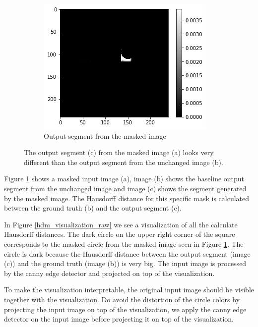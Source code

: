 \begin{figure}[H]
    \begin{subfigure}[t]{.32\textwidth}
        \centering
        \includegraphics[width=\linewidth]{chapters/06_hdm/visualization/segment.png}
        \caption{Output segment from the masked image}
    \end{subfigure}
    \caption{The output segment (c) from the masked image (a) looks very different than the output segment from the unchanged image (b).}
    \label{hdm_visualization_sample}
\end{figure}

Figure \ref{hdm_visualization_sample} shows a masked input image (a), image (b) shows the baseline output segment from the unchanged image and image (c) shows the segment generated by the masked image. The Hausdorff distance for this specific mask is calculated between the ground truth (b) and the output segment (c).

In Figure \ref{hdm_visualization_raw} we see a visualization of all the calculate Hausdorff distances. The dark circle on the upper right corner of the square corresponds to the masked circle from the masked image seen in Figure \ref{hdm_visualization_sample}. The circle is dark because the Hausdorff distance between the output segment (image (c)) and the ground truth (image (b)) is very big. The input image is processed by the canny edge detector and projected on top of the visualization.

To make the visualization interpretable, the original input image should be visible together with the visualization. Do avoid the distortion of the circle colors by projecting
the input image on top of the visualization, we apply the canny edge detector \cite{canny1987computational} on the input image before projecting it on top of the visualization.

